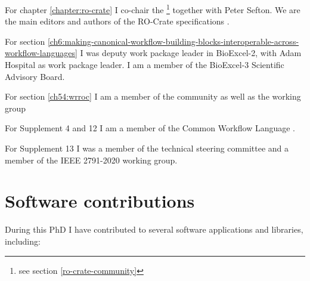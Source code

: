 For chapter \ref{chapter:ro-crate} I co-chair the \footnote{see section \vref{ro-crate-community}} together with Peter Sefton. We are the main editors and authors of the RO-Crate specifications \cite{RO-Crate 1.0,RO-Crate 1.1,RO-Crate 1.1.3,RO-Crate 1.2}.

For section \ref{ch6:making-canonical-workflow-building-blocks-interoperable-across-workflow-languages} I was deputy work package leader in BioExcel-2, with Adam
Hospital as work package leader. I am a member of the BioExcel-3 Scientific Advisory Board.

For section \ref{ch54:wrroc} I am a member of the  community as well as the 
 working group 

For Supplement 4 \cite{Crusoe 2022} and 12 \cite{Khan 2019} I am a member of the Common Workflow Language .

For Supplement 13 \cite{IEEE 2791-2020} I was a member of the
 technical
steering committee and a member of the IEEE 2791-2020 working
group.



\section{Software contributions}

During this PhD I have contributed to several software applications and libraries, including:

